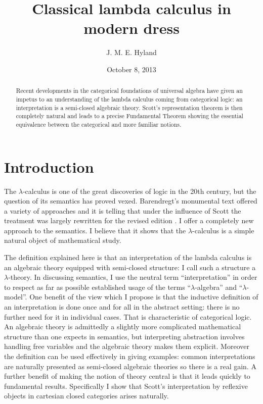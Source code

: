 \documentclass[12pt, amstex, amssymb]{article}
\title{Classical lambda calculus in modern dress}
\author{J. M. E. Hyland}
\date{October 8, 2013}
\begin{document}
\maketitle
\begin{abstract}
Recent developments in the categorical foundations of
universal algebra have given an impetus to an 
understanding of the lambda calculus coming from 
categorical logic: an interpretation is a semi-closed 
algebraic theory. Scott's representation 
theorem is then completely natural and leads to a
precise Fundamental Theorem showing the essential equivalence 
between the categorical and more familiar notions. 
\end{abstract}
\section{Introduction}

The $\lambda$-calculus is one of the great discoveries of logic
in the 20th century, but the question of its semantics has proved
vexed. Barendregt's monumental text \cite{Bar81} offered a variety
of approaches and it is telling that under the influence of Scott
\cite{Scott80} the treatment was largely rewritten
for the revised edition \cite{Bar84}. I offer a completely
new approach to the semantics. I believe that it shows that
the $\lambda$-calculus is a simple natural object of 
mathematical study.

The definition explained here is that an 
interpretation
of the lambda calculus is an algebraic theory equipped
with semi-closed structure: I call such a structure
a $\lambda$-theory. In discussing semantics,
I use the neutral
term ``interpretation'' in order to respect as
far as possible established usage of the
terms ``$\lambda$-algebra''
and ``$\lambda$-model''. One benefit of the view which I propose 
is that the inductive definition of an interpretation is done 
once and for all in the abstract setting: there is no further need
for it in individual cases. That is characteristic of categorical logic.
An algebraic theory is admittedly a slightly 
more complicated mathematical structure than one expects
in semantics, but interpreting abstraction involves
handling free variables and the algebraic theory makes them
explicit. Moreover the definition can be used effectively
in giving examples: common interpretations are naturally
presented as semi-closed algebraic theories so there is 
a real gain. A further benefit of
making the notion of theory central is that it leads quickly 
to fundamental results.
Specifically I show that Scott's interpretation
by reflexive objects in cartesian closed categories
arises naturally.
\end{document}
